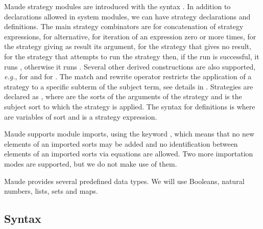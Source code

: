 Maude strategy modules are introduced with the syntax
. In addition to declarations allowed in
system modules, we can have strategy declarations and definitions.
The main strategy combinators are \code{;} for concatenation of strategy 
expressions, \code{|} for alternative, \code{*} for iteration of an
expression zero or more times,  for the strategy giving as result its argument,  for the strategy that gives no result,
 for the strategy that attempts to run the
strategy  then, if the run is successful, it runs ,
otherwise it runs .
Several other derived constructions are also
supported, \emph{e.g.},  for  and  for . The match and rewrite operator 
 restricts the application of a strategy to a specific
subterm of the subject term, see details in \cite{DBLP:conf/maude/2007}.
Strategies are declared as ,
where  are the sorts of the arguments of the strategy
and  is the subject sort to which the strategy is applied.
The syntax for definitions is  where
 are variables of sort  and  is a strategy expression.


Maude supports module imports, using the keyword ,
which means that no new elements of an imported sorts may be 
added and 
no identification between elements of an imported sorts via
equations are allowed. 
Two more importation modes are supported, but we do not make use 
of them.

Maude provides several predefined data types. We will use Booleans, natural
numbers, lists, sets and maps.
  
\subsection{Syntax}

